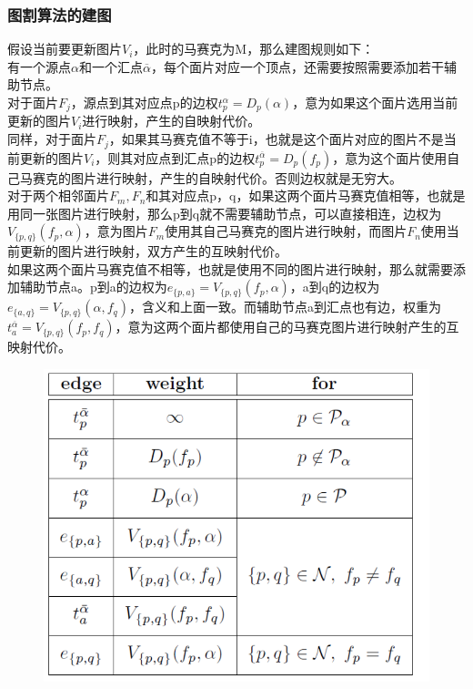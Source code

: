 \documentclass[11pt,a4,notitlepage]{article}
\begin{document}
\begin{CJK}{UTF8}{gkai}
\subsubsection*{图割算法的建图}
假设当前要更新图片$V_{i}$，此时的马赛克为M，那么建图规则如下：\\
有一个源点$\alpha$和一个汇点$\overline{\alpha}$，每个面片对应一个顶点，还需要按照需要添加若干辅助节点。\\
对于面片$F_{j}$，源点到其对应点p的边权$t_{p}^{\alpha}=D_{p}(\alpha)$，意为如果这个面片选用当前更新的图片$V_{i}$进行映射，产生的自映射代价。\\
同样，对于面片$F_{j}$，如果其马赛克值不等于i，也就是这个面片对应的图片不是当前更新的图片$V_{i}$，则其对应点到汇点p的边权$t_{p}^{\overline{\alpha}}=D_{p}(f_{p})$，意为这个面片使用自己马赛克的图片进行映射，产生的自映射代价。否则边权就是无穷大。\\
对于两个相邻面片$F_{m},F_{n}$和其对应点p，q，如果这两个面片马赛克值相等，也就是用同一张图片进行映射，那么p到q就不需要辅助节点，可以直接相连，边权为$V_{\{p,q\}}(f_{p},\alpha)$，意为图片$F_{m}$使用其自己马赛克的图片进行映射，而图片$F_{n}$使用当前更新的图片进行映射，双方产生的互映射代价。\\
如果这两个面片马赛克值不相等，也就是使用不同的图片进行映射，那么就需要添加辅助节点a。p到a的边权为$e_{\{p,a\}}=V_{\{p,q\}}(f_{p},\alpha)$，a到q的边权为$e_{\{a,q\}}=V_{\{p,q\}}(\alpha,f_{q})$，含义和上面一致。而辅助节点a到汇点也有边，权重为$t_{a}^{\overline{\alpha}}=V_{\{p,q\}}(f_{p},f_{q})$，意为这两个面片都使用自己的马赛克图片进行映射产生的互映射代价。\\
 \begin{figure}[h]
	\centering
	\includegraphics[scale=0.5]{cutmatrix.png}

\end{figure}
\end{CJK}
\end{document}
